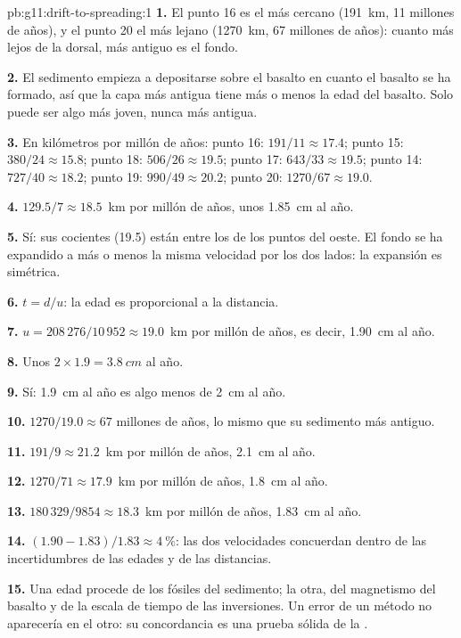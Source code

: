 \begin{solution}{pb:g11:drift-to-spreading:1}
\textbf{1.} El punto 16 es el más cercano (\qty{191}{km}, 11 millones de
años), y el punto 20 el más lejano (\qty{1270}{km}, 67 millones de años):
cuanto más lejos de la dorsal, más antiguo es el fondo.

\textbf{2.} El sedimento empieza a depositarse sobre el basalto en cuanto el
basalto se ha formado, así que la capa más antigua tiene más o menos la edad
del basalto. Solo puede ser algo más joven, nunca más antigua.

\textbf{3.} En kilómetros por millón de años: punto 16: $191/11 \approx 17.4$;
punto 15: $380/24 \approx 15.8$; punto 18: $506/26 \approx 19.5$; punto 17:
$643/33 \approx 19.5$; punto 14: $727/40 \approx 18.2$; punto 19: $990/49
\approx 20.2$; punto 20: $1270/67 \approx 19.0$.

\textbf{4.} $129.5/7 \approx \num{18.5}$~km por millón de años, unos
\qty{1.85}{cm} al año.

\textbf{5.} Sí: sus cocientes (19.5) están entre los de los puntos del oeste.
El fondo se ha expandido a más o menos la misma velocidad por los dos lados:
la expansión es simétrica.

\textbf{6.} $t = d/u$: la edad es proporcional a la distancia.

\textbf{7.} $u = 208\,276/10\,952 \approx \num{19.0}$~km por millón de años,
es decir, \qty{1.90}{cm} al año.

\textbf{8.} Unos $2 \times 1.9 = \qty{3.8}{cm}$ al año.

\textbf{9.} Sí: \qty{1.9}{cm} al año es algo menos de \qty{2}{cm} al año.

\textbf{10.} $1270/19.0 \approx 67$ millones de años, lo mismo que su
sedimento más antiguo.

\textbf{11.} $191/9 \approx \num{21.2}$~km por millón de años,
\qty{2.1}{cm} al año.

\textbf{12.} $1270/71 \approx \num{17.9}$~km por millón de años,
\qty{1.8}{cm} al año.

\textbf{13.} $180\,329/9854 \approx \num{18.3}$~km por millón de años,
\qty{1.83}{cm} al año.

\textbf{14.} $(1.90 - 1.83)/1.83 \approx \qty{4}{\percent}$: las dos
velocidades concuerdan dentro de las incertidumbres de las edades y de las
distancias.

\textbf{15.} Una edad procede de los fósiles del sedimento; la otra, del
magnetismo del basalto y de la escala de tiempo de las inversiones. Un error
de un método no aparecería en el otro: su concordancia es una prueba sólida
de la .


\end{solution}
